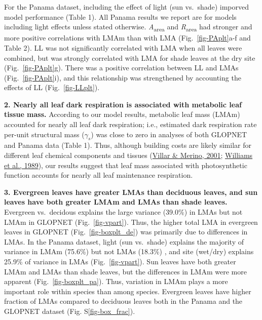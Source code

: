 \documentclass[
  12pt,
  a4paper,
,tablecaptionabove
]{scrartcl}
\begin{document}
For the Panama dataset, including the effect of light (sun vs.~shade)
imporved model performance (Table 1). All Panama results we report are
for models including light effects unless stated otherwise.
\emph{A}\textsubscript{area} and \emph{R}\textsubscript{area} had
stronger and more positive correlations with LMAm than with LMA
(Fig.~\ref{fig-PAplt}a-f and Table 2). LL was not significantly
correlated with LMA when all leaves were combined, but was strongly
correlated with LMA for shade leaves at the dry site
(Fig.~\ref{fig-PAplt}g). There was a positive correlation between LL and
LMAs (Fig.~\ref{fig-PAplt}i), and this relationship was strengthened by
accounting the effects of LL (Fig.~\ref{fig-LLplt}).

\textbf{2. Nearly all leaf dark respiration is associated with metabolic
leaf tissue mass.} According to our model results, metabolic leaf mass
(LMAm) accounted for nearly all leaf dark respiration; i.e., estimated
dark respiration rate per-unit structural mass (\(\gamma_s\)) was close
to zero in analyses of both GLOPNET and Panama data (Table 1). Thus,
although building costs are likely similar for different leaf chemical
components and tissues (\protect\hyperlink{ref-Villar2001}{Villar \&
Merino, 2001}; \protect\hyperlink{ref-Williams1989}{Williams et al.,
1989}), our results suggest that leaf mass associated with
photosynthetic function accounts for nearly all leaf maintenance
respiration.

\textbf{3. Evergreen leaves have greater LMAs than deciduous leaves, and
sun leaves have both greater LMAm and LMAs than shade leaves.} Evergreen
vs.~decidous explains the large variance (39.0\%) in LMAs but not LMAm
in GLOPNET (Fig.~\ref{fig-vpart}). Thus, the higher total LMA in
evergreen leaves in GLOPNET (Fig.~\ref{fig-boxplt_de}) was primarily due
to differences in LMAs. In the Panama dataset, light (sun vs.~shade)
explains the majority of variance in LMAm (75.6\%) but not LMAs (18.3\%)
, and site (wet/dry) explains 25.9\% of variance in LMAs
(Fig.~\ref{fig-vpart}). Sun leaves have both greater LMAm and LMAs than
shade leaves, but the differences in LMAm were more apparent
(Fig.~\ref{fig-boxplt_pa}). Thus, variation in LMAm plays a more
important role within species than among species. Evergreen leaves have
higher fraction of LMAs compared to deciduous leaves both in the Panama
and the GLOPNET dataset (Fig. S\ref{fig-box_frac}).
\end{document}
